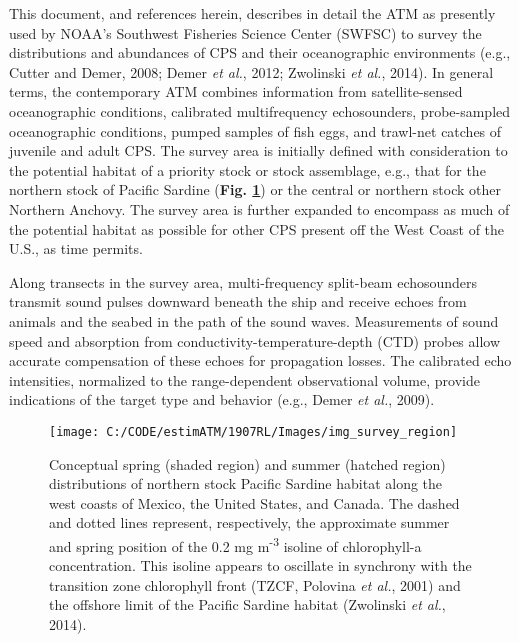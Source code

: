 \documentclass[]{article}
\begin{document}
This document, and references herein, describes in detail the ATM as presently used by NOAA's Southwest Fisheries Science Center (SWFSC) to survey the distributions and abundances of CPS and their oceanographic environments (e.g., Cutter and Demer, 2008; Demer \emph{et al.}, 2012; Zwolinski \emph{et al.}, 2014). In general terms, the contemporary ATM combines information from satellite-sensed oceanographic conditions, calibrated multifrequency echosounders, probe-sampled oceanographic conditions, pumped samples of fish eggs, and trawl-net catches of juvenile and adult CPS. The survey area is initially defined with consideration to the potential habitat of a priority stock or stock assemblage, e.g., that for the northern stock of Pacific Sardine (\textbf{Fig. \ref{fig:sardine-distribution}}) or the central or northern stock other Northern Anchovy. The survey area is further expanded to encompass as much of the potential habitat as possible for other CPS present off the West Coast of the U.S., as time permits.

Along transects in the survey area, multi-frequency split-beam echosounders transmit sound pulses downward beneath the ship and receive echoes from animals and the seabed in the path of the sound waves. Measurements of sound speed and absorption from conductivity-temperature-depth (CTD) probes allow accurate compensation of these echoes for propagation losses. The calibrated echo intensities, normalized to the range-dependent observational volume, provide indications of the target type and behavior (e.g., Demer \emph{et al.}, 2009).

\newpage



\begin{figure}[H]

{\centering \texttt{[image: C:/CODE/estimATM/1907RL/Images/img\_survey\_region]} 

}

\caption{Conceptual spring (shaded region) and summer (hatched region) distributions of northern stock Pacific Sardine habitat along the west coasts of Mexico, the United States, and Canada. The dashed and dotted lines represent, respectively, the approximate summer and spring position of the 0.2 mg m\textsuperscript{-3} isoline of chlorophyll-a concentration. This isoline appears to oscillate in synchrony with the transition zone chlorophyll front (TZCF, Polovina \emph{et al.}, 2001) and the offshore limit of the Pacific Sardine habitat (Zwolinski \emph{et al.}, 2014).}\label{fig:sardine-distribution}
\end{figure}
\end{document}
